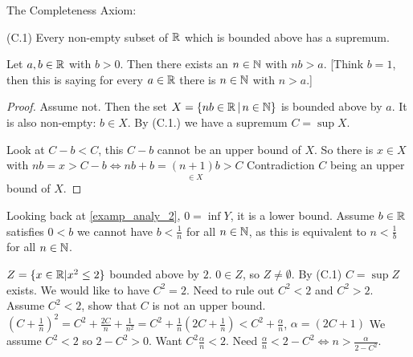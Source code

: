 \documentclass[10pt, a4paper]{article}
\begin{document}
The Completeness Axiom:

(C.1) Every non-empty subset of $\mathbb{R}$ which is bounded above has a supremum.

\begin{theorem}[Archimedes]\label{analy_thm_archim}
    Let $a, b \in \mathbb{R}$ with $b > 0$. Then there exists an $n \in \mathbb{N}$ with $nb > a$.
    [Think $b = 1$, then this is saying for every $a \in \mathbb{R}$ there is $n \in \mathbb{N}$ with $n > a$.]
    \begin{proof}
        Assume not.
        Then the set $X = \{nb \in \mathbb{R} \,|\, n \in \mathbb{N}\}$ is bounded above by $a$.
        It is also non-empty:
        $b \in X$.
        By (C.1.) we have a supremum $C = \sup X$.

        Look at $C - b < C$,
        this $C - b$ cannot be an upper bound of $X$.
        So there is $x \in X$ with $nb = x > C - b \iff nb + b = \underset{\in X}{(n + 1)b} > C$
        Contradiction $C$ being an upper bound of $X$.
    \end{proof}
\end{theorem}

Looking back at \autoref{examp_analy_2},
$0 = \inf Y$,
it is a lower bound.
Assume $b \in \mathbb{R}$ satisfies $0 < b$ we cannot have $b < \frac{1}{n}$ for all $n \in \mathbb{N}$,
as this is equivalent to $n < \frac{1}{b}$ for all $n \in \mathbb{N}$.

\begin{example}
    $Z = \{x \in \mathbb{R} | x ^ 2 \leq 2\}$
    bounded above by $2$.
    $0 \in Z$, so $Z \neq \emptyset$.
    By (C.1) $C = \sup Z$ exists.
    We would like to have $C ^ 2 = 2$.
    Need to rule out $C ^ 2 < 2$ and $C ^ 2 > 2$.
    Assume $C ^ 2 < 2$,
    show that $C$ is not an upper bound.
    $\left(C + \frac{1}{n}\right) ^ 2 = C ^ 2 + \frac{2C}{n}+ \frac{1}{n ^ 2} = C ^ 2 + \frac{1}{n}\left(2C + \frac{1}{n}\right) < C ^ 2 + \frac{\alpha}{n}$, $\alpha = \left(2C + 1\right)$
    We assume $C ^ 2 < 2$ so $2 - C ^ 2 > 0$.
    Want $C ^ 2 \frac{\alpha}{n} < 2$.
    Need $\frac{\alpha}{n} < 2 - C ^ 2 \iff n > \frac{\alpha}{2 - C ^ 2}$.
\end{example}
\end{document}
